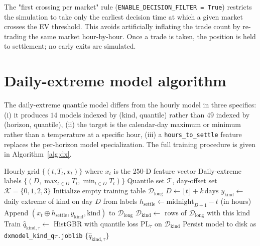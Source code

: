 \documentclass[11pt]{article}
\begin{document}
The "first crossing per market" rule (\texttt{ENABLE\_DECISION\_FILTER = True})
restricts the simulation to take only the earliest decision time at which a
given market crosses the EV threshold. This avoids artificially inflating the
trade count by re-trading the same market hour-by-hour. Once a trade is taken,
the position is held to settlement; no early exits are simulated.

\section{Daily-extreme model algorithm}
\label{app:dx-algo}

The daily-extreme quantile model differs from the hourly model in three
specifics: (i) it produces $14$ models indexed by (kind, quantile) rather
than $49$ indexed by (horizon, quantile), (ii) the target is the calendar-day
maximum or minimum rather than a temperature at a specific hour, (iii) a
\texttt{hours\_to\_settle} feature replaces the per-horizon model
specialization. The full training procedure is given in
Algorithm~\ref{alg:dx}.

\begin{algorithm}[h]
\caption{Daily-extreme quantile model training.}
\label{alg:dx}
\begin{algorithmic}[1]
\Require Hourly grid $\{(t, T_t, x_t)\}$ where $x_t$ is the 250-D feature vector
\Require Daily-extreme labels $\{(D, \max_{t \in D} T_t, \min_{t \in D} T_t)\}$
\Require Quantile set $\mathcal{T}$, day-offset set $\mathcal{K} = \{0,1,2,3\}$
\State Initialize empty training table $\mathcal{D}_\text{long}$
        \State $D \gets \lfloor t \rfloor + k\,\text{days}$
            \State $y_{\text{kind}} \gets$ daily extreme of kind on day $D$ from labels
            \State $h_\text{settle} \gets \text{midnight}_{D+1} - t$ (in hours)
            \State Append $(x_t \oplus h_\text{settle}, y_\text{kind}, \text{kind})$ to $\mathcal{D}_\text{long}$
        \EndFor
    \EndFor
\EndFor
{}
    \State $\mathcal{D}_\text{kind} \gets$ rows of $\mathcal{D}_\text{long}$ with this kind
        \State Train $\hat{q}_{\text{kind}, \tau} \gets$ HistGBR with quantile loss $\mathrm{PL}_\tau$ on $\mathcal{D}_\text{kind}$
        \State Persist model to disk as \texttt{dxmodel\_kind\_q$\tau$.joblib}
    \EndFor
\EndFor
\State \Return $\{\hat{q}_{\text{kind}, \tau}\}$
\end{algorithmic}
\end{algorithm}
\end{document}
